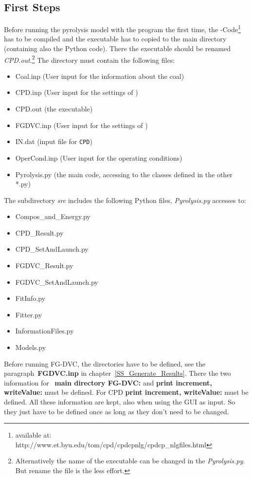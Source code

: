 \subsection{First Steps}\label{SS_1stSteps}
Before running the \CPD pyrolysis model with the program the first time, the \CPD-Code\footnote{available at: http://www.et.byu.edu/\texttildelow tom/cpd/cpdcpnlg/cpdcp\_nlgfiles.html} has to be compiled and the executable has to copied to the main directory (containing also the Python code). There the \CPD executable should be renamed \emph{CPD.out}.\footnote{Alternatively the name of the executable can be changed in the \emph{Pyrolysis.py}. But rename the file is the less effort.}
The directory must contain the following files:
\begin{itemize}
 \item Coal.inp (User input for the information about the coal)
 \item CPD.inp (User input for the settings of \CPD)
 \item CPD.out (the \CPD executable)
 \item FGDVC.inp (User input for the settings of \FGDVC)
 \item IN.dat (input file for \texttt{CPD})
 \item OperCond.inp (User input for the operating conditions)
 \item Pyrolysis.py (the main code, accessing to the classes defined in the other *.py)
\end{itemize}
The subdirectory \textit{src} includes the following Python files, \textit{Pyrolysis.py} accesses to:
\begin{itemize}
 \item Compos\_and\_Energy.py
 \item CPD\_Result.py
 \item CPD\_SetAndLaunch.py
 \item FGDVC\_Result.py
 \item FGDVC\_SetAndLaunch.py
 \item FitInfo.py
 \item Fitter.py
 \item InformationFiles.py
 \item Models.py
\end{itemize}
Before running FG-DVC, the directories have to be defined, see the paragraph~\textbf{FGDVC.inp} in chapter~\ref{SS_Generate_Results}. There the  two information for ~\textbf{main directory FG-DVC:} and \textbf{print increment, writeValue:} must be defined. For CPD \textbf{print increment, writeValue:} must be defined. All these information are kept, also when using the GUI as input. So they just have to be defined once as long as they don't need to be changed.

